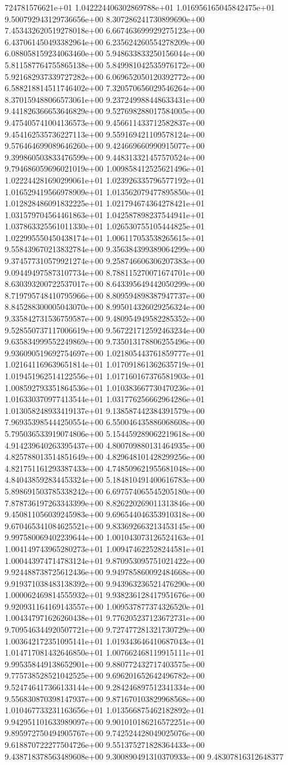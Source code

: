 724781576621e+01	1.042224406302869788e+01	1.016956165045842475e+01	9.500792943129736656e+00	8.307286241730899690e+00	7.453432620519278018e+00	6.667463699929275123e+00	6.437061450493382964e+00	6.235624260554278209e+00	6.088058159234063460e+00	5.948633833250156044e+00	5.811587764755865138e+00	5.849981042535976172e+00	5.921682937339727282e+00	6.069652050120392772e+00	6.588218814511746402e+00	7.320570656029546264e+00	8.370159488066573061e+00	9.237249988448633431e+00	9.441826366653646829e+00	9.527698288017584005e+00	9.475405741004136573e+00	9.456611433712582837e+00	9.454162535736227113e+00	9.559169421109578124e+00	9.576464699089646260e+00	9.424669660990915077e+00	9.399860503833476599e+00	9.448313321457570524e+00	9.794686059696021019e+00	1.009858412525621496e+01	1.022244281690299061e+01	1.023926335796577192e+01	1.016529419566978909e+01	1.013562079477895850e+01	1.012828486091832225e+01	1.021794674364278421e+01	1.031579704564461863e+01	1.042587898237544941e+01	1.037863325561011330e+01	1.026530755105444825e+01	1.022995550450438174e+01	1.006117053538265615e+01	9.558439670213832784e+00	9.356384399389064299e+00	9.374577310579921274e+00	9.258746606306207383e+00	9.094494975873107734e+00	8.788115270071674701e+00	8.630393200722537017e+00	8.643395649442050299e+00	8.719795748410795966e+00	8.809594898387947737e+00	8.845288300005043070e+00	8.995014326029256324e+00	9.335842731536759587e+00	9.480954949582285352e+00	9.528550737117006619e+00	9.567221712592463234e+00	9.635834999552249869e+00	9.735013178806255496e+00	9.936090519692754697e+00	1.021805443761859777e+01	1.021641169639651814e+01	1.017091861362635719e+01	1.019451962514122556e+01	1.017160167376581903e+01	1.008592793351864536e+01	1.010383667730470236e+01	1.016330370977413544e+01	1.031776256662964286e+01	1.013058248933419137e+01	9.138587442384391579e+00	7.969353985444250554e+00	6.550046435886068608e+00	5.795036533919074806e+00	5.154459289062219618e+00	4.914239640263395437e+00	4.800709880131464935e+00	4.825788013514851649e+00	4.829648101428299256e+00	4.821751161293387433e+00	4.748509621955681048e+00	4.840438592834453324e+00	5.184810491400616783e+00	5.898691503785338242e+00	6.697574065545205180e+00	7.878736197263343399e+00	8.826220269011313846e+00	9.450811056039245983e+00	9.696544046353910318e+00	9.670465341084625521e+00	9.833692663213453145e+00	9.997580069402239644e+00	1.001043073126524163e+01	1.004149743965280273e+01	1.009474622528244581e+01	1.000443974714783124e+01	9.870953095751021422e+00	9.924488738725612436e+00	9.949785860092484668e+00	9.919371038483138392e+00	9.943963236521476290e+00	1.000062469814555932e+01	9.938236128417951676e+00	9.920931164169143557e+00	1.009537877374326520e+01	1.004347971626260438e+01	9.776205237123672731e+00	9.709546344920507721e+00	9.727477281321730729e+00	1.003642172351095141e+01	1.019343646410687043e+01	1.014717081432646850e+01	1.007662468119915111e+01	9.995358449138652901e+00	9.880772432717403575e+00	9.775738528521042525e+00	9.696201652642496782e+00	9.524746417366133144e+00	9.284246897512341334e+00	9.556830870398147937e+00	9.871670103829968568e+00	1.010467733231163656e+01	1.013566875462182892e+01	9.942951101633989097e+00	9.901010186216572251e+00	9.895972750494905767e+00	9.742524428049025076e+00	9.618870722277504726e+00	9.551375271828364433e+00	9.438718378563489608e+00	9.300890491310370933e+00	9.48307816312648377